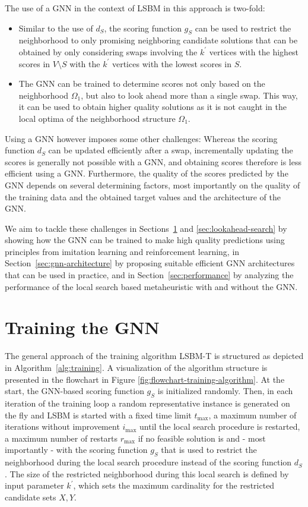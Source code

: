 \documentclass[draft,final]{vutinfth} %
\begin{document}
The use of a GNN in the context of LSBM in this approach is two-fold: 
\begin{itemize}
    \item Similar to the use of $d_S$, the scoring function $g_S$ can be used to restrict the neighborhood to only promising neighboring candidate solutions that can be obtained by only considering swaps involving the $k^\prime$ vertices with the highest scores in $V \setminus S$ with the $k^\prime$ vertices with the lowest scores in $S$. 
    \item The GNN can be trained to determine scores not only based on the neighborhood $\Omega_1$, but also to look ahead more than a single swap. This way, it can be used to obtain higher quality solutions as it is not caught in the local optima of the neighborhood structure $\Omega_1$.
\end{itemize}

Using a GNN however imposes some other challenges: 
Whereas the scoring function $d_S$ can be updated efficiently after a swap, incrementally updating the scores is generally not possible with a GNN, and obtaining scores therefore is less efficient using a GNN. 
Furthermore, the quality of the scores predicted by the GNN depends on several determining factors, most importantly on the quality of the training data and the obtained target values and the architecture of the GNN. 

We aim to tackle these challenges in Sections~\ref{sec:gnn-training} and \ref{sec:lookahead-search} by showing how the GNN can be trained to make high quality predictions using principles from imitation learning and reinforcement learning, in Section~\ref{sec:gnn-architecture} by proposing suitable efficient GNN architectures that can be used in practice, and in Section~\ref{sec:performance} by analyzing the performance of the local search based metaheuristic with and without the GNN. 

\section{Training the GNN}\label{sec:gnn-training}

The general approach of the training algorithm LSBM-T is structured as depicted in Algorithm~\ref{alg:training}. A visualization of the algorithm structure is presented in the flowchart in Figure \ref{fig:flowchart-training-algorithm}. 
At the start, the GNN-based scoring function $g_S$ is initialized randomly. Then, in each iteration of the training loop a random representative instance is generated on the fly and LSBM is started with a fixed time limit $t_{\max}$, a maximum number of iterations without improvement $i_{\max}$ until the local search procedure is restarted, a maximum number of restarts $r_{\max}$ if no feasible solution is and - most importantly - with the scoring function $g_S$ that is used to restrict the neighborhood during the local search procedure instead of the scoring function $d_S$. The size of the restricted neighborhood during this local search is defined by input parameter $k^\prime$, which sets the maximum cardinality for the restricted candidate sets $X, Y$.
\end{document}
